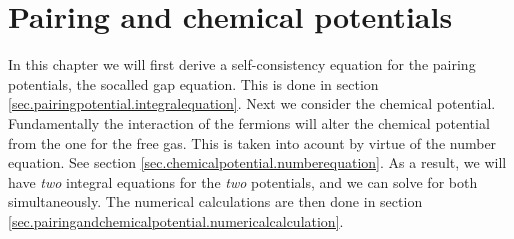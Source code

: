 
\chapter{Pairing and chemical potentials} %

\label{Chapter5} %


In this chapter we will first derive a self-consistency equation for the pairing potentials, the socalled gap equation. This is done in section \ref{sec.pairingpotential.integralequation}. Next we consider the chemical potential. Fundamentally the interaction of the fermions will alter the chemical potential from the one for the free gas. This is taken into acount by virtue of the number equation. See section \ref{sec.chemicalpotential.numberequation}. As a result, we will have \textit{two} integral equations for the \textit{two} potentials, and we can solve for both simultaneously. The numerical calculations are then done in section \ref{sec.pairingandchemicalpotential.numericalcalculation}. 

